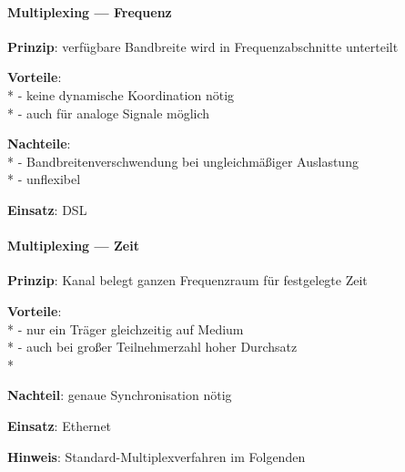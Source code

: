 \paragraph{Multiplexing --- Frequenz}
\begin{items}
  \item \textbf{Prinzip}: verfügbare Bandbreite wird in Frequenzabschnitte unterteilt
  \item \textbf{Vorteile}: \\*
    - keine dynamische Koordination nötig \\*
    - auch für analoge Signale möglich
  \item \textbf{Nachteile}: \\*
    - Bandbreitenverschwendung bei ungleichmäßiger Auslastung \\*
    - unflexibel
  \item \textbf{Einsatz}: DSL
\end{items}

\paragraph{Multiplexing --- Zeit}
\begin{items}
  \item \textbf{Prinzip}: Kanal belegt ganzen Frequenzraum für festgelegte Zeit
  \item \textbf{Vorteile}: \\*
    - nur ein Träger gleichzeitig auf Medium \\*
    - auch bei großer Teilnehmerzahl hoher Durchsatz \\*
  \item \textbf{Nachteil}: genaue Synchronisation nötig
  \item \textbf{Einsatz}: Ethernet
  \item \textbf{Hinweis}: Standard-Multiplexverfahren im Folgenden
\end{items}

